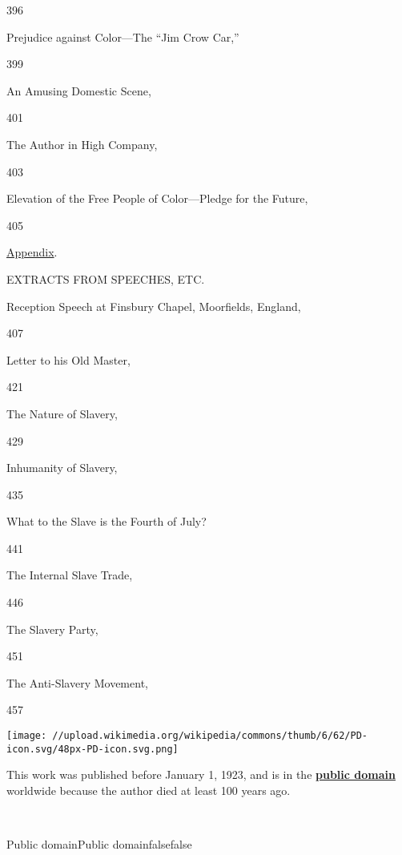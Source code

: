 396

Prejudice against Color---The ``Jim Crow Car,''

399

An Amusing Domestic Scene,

401

The Author in High Company,

403

Elevation of the Free People of Color---Pledge for the Future,

405

\href{/wiki/My_Bondage_and_My_Freedom_(1855)/Appendix}{Appendix}.

EXTRACTS FROM SPEECHES, ETC.

Reception Speech at Finsbury Chapel, Moorfields, England,

407

Letter to his Old Master,

421

The Nature of Slavery,

429

Inhumanity of Slavery,

435

What to the Slave is the Fourth of July?

441

The Internal Slave Trade,

446

The Slavery Party,

451

The Anti-Slavery Movement,

457

\protect\hypertarget{imageLeft}{}{\texttt{[image: //upload.wikimedia.org/wikipedia/commons/thumb/6/62/PD-icon.svg/48px-PD-icon.svg.png]}}

\hypertarget{licFrame-centertext}{}
This work was published before January 1, 1923, and is in the
\textbf{\href{https://en.wikipedia.org/wiki/Public_domain}{public
domain}} worldwide because the author died at least 100 years ago.

\protect\hypertarget{noimageRight}{}{~}

{Public domain}{Public domain}{false}{false}

